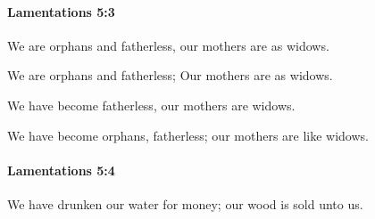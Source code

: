 		\paragraph{Lamentations 5:3} %
			\label{LAMENTATIONS-5-3}

			We are orphans and fatherless, our mothers are as widows.

			\begin{versebox}
					\item[BHS] 
					\item[LXX] 
					\item[ASV] We are orphans and fatherless; Our mothers are as widows.
					\item[NIV] We have become fatherless, our mothers are widows.
					\item[NRSV] We have become orphans, fatherless; our mothers are like widows.
			\end{versebox}

		\paragraph{Lamentations 5:4} %
			\label{LAMENTATIONS-5-4}

			We have drunken our water for money; our wood is sold unto us.

